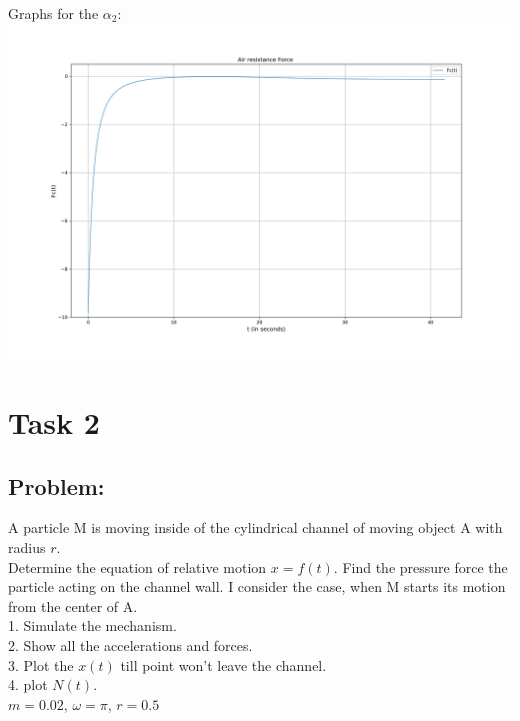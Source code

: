 \documentclass[a4paper,11pt,oneside,article]{memoir}
\begin{document}
Graphs for the $\alpha_2$:\\
\includegraphics[width=14cm]{images/fc.png}\\

\section*{Task 2}
\subsection{Problem:}
A particle M is moving inside of the cylindrical channel of moving object A with radius $r$.\\
Determine the equation of relative motion $x=f(t)$. Find the pressure force the particle acting on the channel wall. I consider the case, when M starts its motion from the center of A.\\
1. Simulate the mechanism.\\
2. Show all the accelerations and forces.\\
3. Plot the $x(t)$ till point won't leave the channel.\\
4. plot $N(t)$. \\
$m = 0.02$, $\omega = \pi$, $r=0.5$\\
\end{document}

